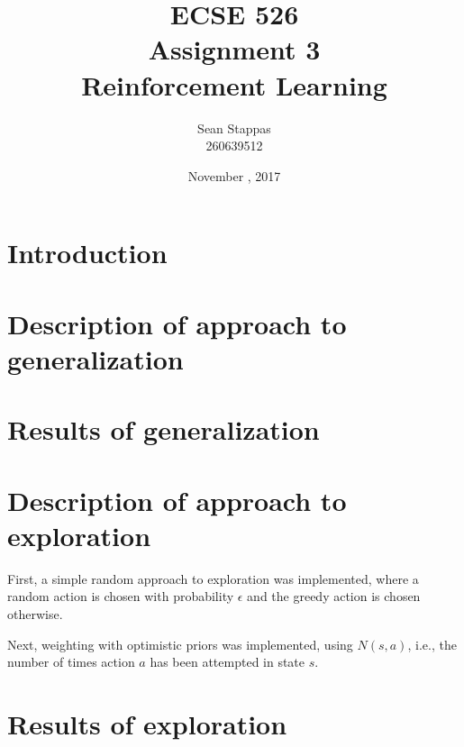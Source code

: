 \documentclass[a4paper,titlepage]{article}
\title{
	\textbf{ECSE 526 \\ Assignment 3}
	\\ \large Reinforcement Learning
}
\author{Sean Stappas \\ 260639512}
\date{November \nth{7}, 2017}
\begin{document}
	\sloppy
	\maketitle
	\twocolumn
	
	\section*{Introduction}
	
	
	\section{Description of approach to generalization}
	
	
	\section{Results of generalization}
	
	
	\section{Description of approach to exploration}
	
	First, a simple random approach to exploration was implemented, where a random action is chosen with probability $\epsilon$ and the greedy action is chosen otherwise.
	
	
	Next, weighting with optimistic priors was implemented, using $N(s, a)$, i.e., the number of times action $a$ has been attempted in state $s$.
	
	
	
	\section{Results of exploration}
	
\end{document}
